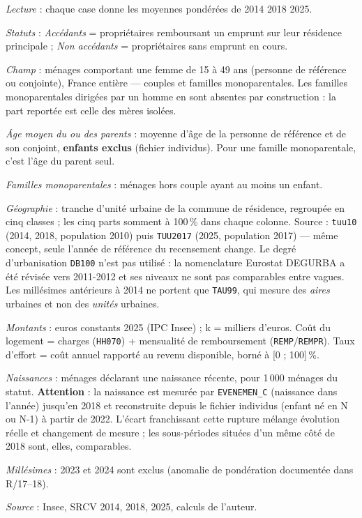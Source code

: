 \documentclass[12pt,a4paper]{article}
\begin{document}
\begin{table}[h!]
\begin{threeparttable}
		\begin{tablenotes}[flushleft]\scriptsize
			\item \textit{Lecture} : chaque case donne les moyennes pondérées de \textcolor{srcv1}{2014}\,\textbar\,\textcolor{srcv2}{2018}\,\textbar\,\textcolor{srcv3}{2025}.
			\item \textit{Statuts} : \textit{Accédants} = propriétaires remboursant un emprunt sur
			leur résidence principale ; \textit{Non accédants} = propriétaires sans emprunt en cours.
			\item \textit{Champ} : ménages comportant une femme de 15 à 49      ans (personne de référence ou conjointe), France entière --- couples et familles
			monoparentales. Les familles monoparentales dirigées par un homme en sont absentes
			par construction : la part reportée est celle des mères isolées.
			\item \textit{Âge moyen du ou des parents} : moyenne d'âge de la personne de référence
			et de son conjoint, \textbf{enfants exclus} (fichier individus). Pour une famille
			monoparentale, c'est l'âge du parent seul.
			\item \textit{Familles monoparentales} : ménages hors couple ayant au moins un enfant.
			\item \textit{Géographie} : tranche d'unité urbaine de la commune de résidence, regroupée
			en cinq classes ; les cinq parts somment à 100\,\% dans chaque colonne. Source :
			\texttt{tuu10} (2014, 2018, population 2010) puis \texttt{TUU2017} (2025, population
			2017) --- même concept, seule l'année de référence du recensement change.
			Le degré d'urbanisation \texttt{DB100} n'est pas utilisé : la nomenclature Eurostat
			DEGURBA a été révisée vers 2011-2012 et ses niveaux ne sont pas comparables entre
			vagues. Les millésimes antérieurs à 2014 ne portent que \texttt{TAU99}, qui mesure des
			\textit{aires} urbaines et non des \textit{unités} urbaines.
			\item \textit{Montants} : euros constants 2025 (IPC Insee) ; k\texteuro{} = milliers d'euros.
			Coût du logement =
			charges (\texttt{HH070}) + mensualité de remboursement (\texttt{REMP}/\texttt{REMPR}).
			Taux d'effort = coût annuel rapporté au revenu disponible, borné à [0 ; 100]\,\%.
			\item \textit{Naissances} : ménages déclarant une naissance récente, pour 1\,000
			ménages du statut. \textbf{Attention} : la naissance est mesurée par \texttt{EVENEMEN\_C}
			(naissance dans l'année) jusqu'en 2018 et reconstruite depuis le fichier individus
			(enfant né en N ou N-1) à partir de 2022. L'écart franchissant cette rupture mélange
			évolution réelle et changement de mesure ; les sous-périodes situées d'un même côté
			de 2018 sont, elles, comparables.
			\item \textit{Millésimes} : 2023 et 2024 sont exclus (anomalie de pondération
			documentée dans R/17--18).
			\item \textit{Source} : Insee, SRCV 2014, 2018, 2025, calculs de l'auteur.
		\end{tablenotes}
	\end{threeparttable}
\end{table}
\end{document}
